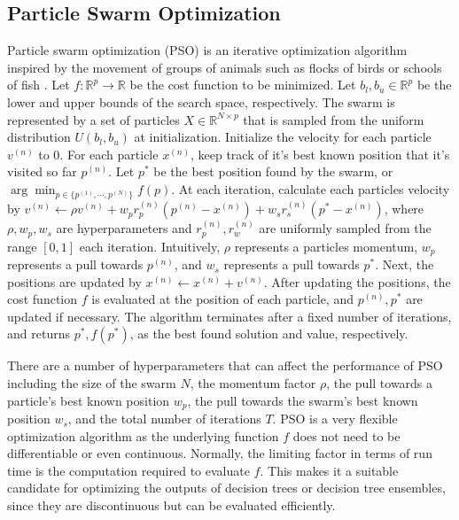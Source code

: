 \documentclass[pageno]{jpaper}
\begin{document}
\begin{doublespacing}
\subsection{Particle Swarm Optimization}
Particle swarm optimization (PSO) is an iterative optimization algorithm inspired by the movement of groups of animals such as flocks of birds or schools of fish \cite{kennedy}. Let $f: \mathbb{R}^p \rightarrow \mathbb{R}$ be the cost function to be minimized. Let $b_{l}, b_{u} \in \mathbb{R}^p$ be the lower and upper bounds of the search space, respectively. The swarm is represented by a set of particles $X \in \mathbb{R}^{N \times p}$ that is sampled from the uniform distribution $U(b_l, b_u)$ at initialization. Initialize the velocity for each particle $v^{(n)}$ to 0. For each particle $x^{(n)}$, keep track of it's best known position that it's visited so far $p^{(n)}$. Let $p^*$ be the best position found by the swarm, or $\arg \min_{p \in \{ p^{(1)}, \cdots, p^{(N)} \}} f(p)$. At each iteration, calculate each particles velocity by $v^{(n)} \leftarrow \rho v^{(n)} + w_p r_p^{(n)} (p^{(n)} - x^{(n)}) + w_s r_s^{(n)} (p^* - x^{(n)})$, where $\rho, w_p, w_s$ are hyperparameters and $r_p^{(n)}, r_w^{(n)}$ are uniformly sampled from the range $[0, 1]$ each iteration. Intuitively, $\rho$ represents a particles momentum, $w_p$ represents a pull towards $p^{(n)}$, and $w_s$ represents a pull towards $p^*$. Next, the positions are updated by $x^{(n)} \leftarrow x^{(n)} + v^{(n)}$. After updating the positions, the cost function $f$ is evaluated at the position of each particle, and $p^{(n)}, p^*$ are updated if necessary. The algorithm terminates after a fixed number of iterations, and returns $p^*, f(p^*)$, as the best found solution and value, respectively.

There are a number of hyperparameters that can affect the performance of PSO including the size of the swarm $N$, the momentum factor $\rho$, the pull towards a particle's best known position $w_p$, the pull towards the swarm's best known position $w_s$, and the total number of iterations $T$. PSO is a very flexible optimization algorithm as the underlying function $f$ does not need to be differentiable or even continuous. Normally, the limiting factor in terms of run time is the computation required to evaluate $f$. This makes it a suitable candidate for optimizing the outputs of decision trees or decision tree ensembles, since they are discontinuous but can be evaluated efficiently.


\end{doublespacing}
\end{document}
